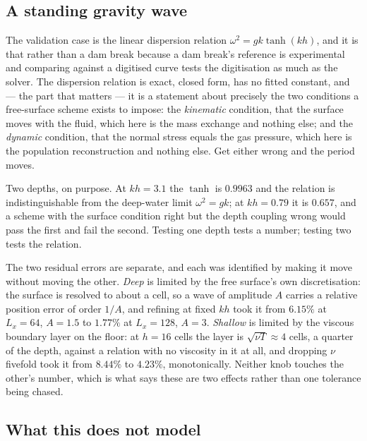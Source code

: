 \documentclass[11pt,a4paper]{article}
\begin{document}
\subsection{A standing gravity wave}
\label{sec:gravitywave}

The validation case is the linear dispersion relation
$\omega^2 = g k \tanh(k h)$, and it is that rather than a dam break because a
dam break's reference is experimental and comparing against a digitised curve
tests the digitisation as much as the solver. The dispersion relation is exact,
closed form, has no fitted constant, and --- the part that matters --- it is a
statement about precisely the two conditions a free-surface scheme exists to
impose: the \emph{kinematic} condition, that the surface moves with the fluid,
which here is the mass exchange and nothing else; and the \emph{dynamic}
condition, that the normal stress equals the gas pressure, which here is the
population reconstruction and nothing else. Get either wrong and the period
moves.

Two depths, on purpose. At $kh = 3.1$ the $\tanh$ is $0.9963$ and the relation
is indistinguishable from the deep-water limit $\omega^2 = gk$; at $kh = 0.79$
it is $0.657$, and a scheme with the surface condition right but the depth
coupling wrong would pass the first and fail the second. Testing one depth tests
a number; testing two tests the relation.

The two residual errors are separate, and each was identified by making it move
without moving the other. \emph{Deep} is limited by the free surface's own
discretisation: the surface is resolved to about a cell, so a wave of amplitude
$A$ carries a relative position error of order $1/A$, and refining at fixed $kh$
took it from $6.15\%$ at $L_x = 64$, $A = 1.5$ to $1.77\%$ at $L_x = 128$,
$A = 3$. \emph{Shallow} is limited by the viscous boundary layer on the floor:
at $h = 16$ cells the layer is $\sqrt{\nu T} \approx 4$ cells, a quarter of the
depth, against a relation with no viscosity in it at all, and dropping $\nu$
fivefold took it from $8.44\%$ to $4.23\%$, monotonically. Neither knob touches
the other's number, which is what says these are two effects rather than one
tolerance being chased.

\subsection{What this does not model}
\end{document}
